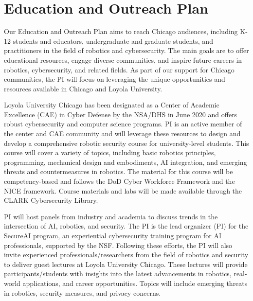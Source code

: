 \section{Education and Outreach Plan}
Our Education and Outreach Plan aims to reach Chicago audiences, including K-12 students and educators, undergraduate and graduate students, and practitioners in the field of robotics and cybersecurity. 
The main goals are to offer educational resources, engage diverse communities, and inspire future careers in robotics, cybersecurity, and related fields.
As part of our support for Chicago communities, the PI will focus on leveraging the unique opportunities and resources available in Chicago and Loyola University.   

Loyola University Chicago has been designated as a Center of Academic Excellence (CAE) in Cyber Defense by the NSA/DHS in June 2020 and offers robust cybersecurity and computer science programs.
PI is an active member of the center and CAE community and will leverage these resources to design and develop a comprehensive robotic security course for university-level students. 
This course will cover a variety of topics, including basic robotics principles, programming, mechanical design and embodiments, AI integration, and emerging threats and countermeasures in robotics. 
The material for this course will be competency-based and follows the DoD Cyber Workforce Framework and the NICE framework. Course materials and labs will be made available through the CLARK Cybersecurity Library.

PI will host panels from industry and academia to discuss trends in the intersection of AI, robotics, and security. 
The PI is the lead organizer (PI) for the SecureAI program, an experiential cybersecurity training program for AI professionals, supported by the NSF.
Following these efforts, the PI
will also invite experienced professionals/researchers from the field of robotics and security to deliver guest lectures at Loyola University Chicago. 
These lectures will provide participants/students with insights into the latest advancements in robotics, real-world applications, and career opportunities. Topics will include emerging threats in robotics, security measures, and privacy concerns.

